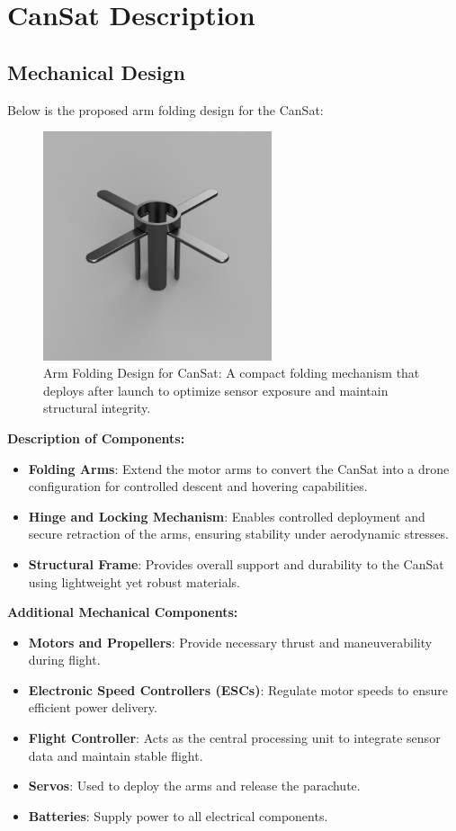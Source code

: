 \documentclass{article}
\begin{document}
\section{CanSat Description}

\subsection{Mechanical Design}
Below is the proposed arm folding design for the CanSat:
\begin{figure}[H]
    \centering
    \includegraphics[width=0.6\textwidth]{resources/arm-folding-design.PNG}
    \caption{Arm Folding Design for CanSat: A compact folding mechanism that deploys after launch to optimize sensor exposure and maintain structural integrity.}
\end{figure}
\textbf{Description of Components:}
\begin{itemize}
    \item \textbf{Folding Arms}: Extend the motor arms to convert the CanSat into a drone configuration for controlled descent and hovering capabilities.
    \item \textbf{Hinge and Locking Mechanism}: Enables controlled deployment and secure retraction of the arms, ensuring stability under aerodynamic stresses.
    \item \textbf{Structural Frame}: Provides overall support and durability to the CanSat using lightweight yet robust materials.
\end{itemize}
\textbf{Additional Mechanical Components:}
\begin{itemize}
    \item \textbf{Motors and Propellers}: Provide necessary thrust and maneuverability during flight.
    \item \textbf{Electronic Speed Controllers (ESCs)}: Regulate motor speeds to ensure efficient power delivery.
    \item \textbf{Flight Controller}: Acts as the central processing unit to integrate sensor data and maintain stable flight.
    \item \textbf{Servos}: Used to deploy the arms and release the parachute.
    \item \textbf{Batteries}: Supply power to all electrical components.
\end{itemize}
\end{document}
